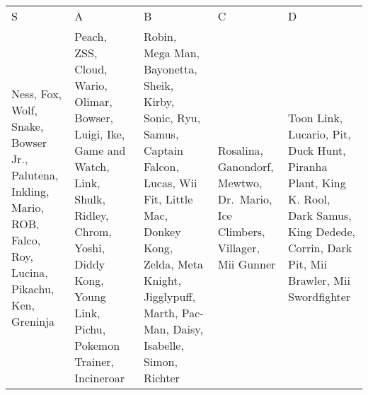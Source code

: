 \documentclass[]{article}
\begin{document}
\begin{longtable}[]{@{}lllll@{}}
\toprule
\endhead
\begin{minipage}[t]{0.14\columnwidth}\raggedright
S\strut
\end{minipage} & \begin{minipage}[t]{0.21\columnwidth}\raggedright
A\strut
\end{minipage} & \begin{minipage}[t]{0.25\columnwidth}\raggedright
B\strut
\end{minipage} & \begin{minipage}[t]{0.09\columnwidth}\raggedright
C\strut
\end{minipage} & \begin{minipage}[t]{0.17\columnwidth}\raggedright
D\strut
\end{minipage}\tabularnewline
\begin{minipage}[t]{0.14\columnwidth}\raggedright
Ness, Fox, Wolf, Snake, Bowser Jr., Palutena, Inkling, Mario, ROB,
Falco, Roy, Lucina, Pikachu, Ken, Greninja\strut
\end{minipage} & \begin{minipage}[t]{0.21\columnwidth}\raggedright
Peach, ZSS, Cloud, Wario, Olimar, Bowser, Luigi, Ike, Game and Watch,
Link, Shulk, Ridley, Chrom, Yoshi, Diddy Kong, Young Link, Pichu,
Pokemon Trainer, Incineroar\strut
\end{minipage} & \begin{minipage}[t]{0.25\columnwidth}\raggedright
Robin, Mega Man, Bayonetta, Sheik, Kirby, Sonic, Ryu, Samus, Captain
Falcon, Lucas, Wii Fit, Little Mac, Donkey Kong, Zelda, Meta Knight,
Jigglypuff, Marth, Pac-Man, Daisy, Isabelle, Simon, Richter\strut
\end{minipage} & \begin{minipage}[t]{0.09\columnwidth}\raggedright
Rosalina, Ganondorf, Mewtwo, Dr.~Mario, Ice Climbers, Villager, Mii
Gunner\strut
\end{minipage} & \begin{minipage}[t]{0.17\columnwidth}\raggedright
Toon Link, Lucario, Pit, Duck Hunt, Piranha Plant, King K. Rool, Dark
Samus, King Dedede, Corrin, Dark Pit, Mii Brawler, Mii
Swordfighter\strut
\end{minipage}\tabularnewline
\bottomrule
\end{longtable}
\end{document}
